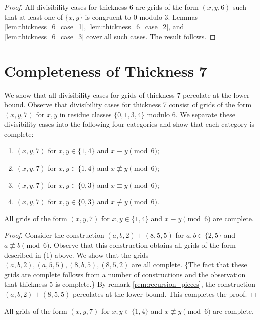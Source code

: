 \begin{proof}
All divisibility cases for thickness 6 are grids of the form $(x,y,6)$ such that at least one of $\{x,y\}$ is congruent to 0 modulo 3. Lemmas \ref{lem:thickness_6_case_1}, \ref{lem:thickness_6_case_2}, and \ref{lem:thickness_6_case_3} cover all such cases. The result follows.
\end{proof}

\section{Completeness of Thickness 7}

We show that all divisibility cases for grids of thickness 7 percolate at the lower bound. Observe that divisibility cases for thickness 7 consist of grids of the form $(x,y,7)$ for $x,y$ in residue classes $\{0,1,3,4\}$ modulo 6. We separate these divisibility cases into the following four categories and show that each category is complete:
\begin{enumerate}
\item $(x,y,7)$ for $x,y \in \{1,4\}$ and $x \equiv y \pmod 6$;
\item $(x,y,7)$ for $x,y \in \{1,4\}$ and $x \not\equiv y \pmod 6$;
\item $(x,y,7)$ for $x,y \in \{0,3\}$ and $x \equiv y \pmod 6$;
\item $(x,y,7)$ for $x,y \in \{0,3\}$ and $x \not\equiv y \pmod 6$.
\end{enumerate}

\begin{lem}
\label{lem:thickness_7_case_1}
All grids of the form $(x,y,7)$ for $x,y \in \{1,4\}$ and $x \equiv y \pmod 6$ are complete.
\end{lem}

\begin{proof}
Consider the construction $(a,b,2) + (8,5,5)$ for $a,b \in \{2,5\}$ and $a \not\equiv b \pmod 6$. Observe that this construction obtains all grids of the form described in (1) above. We show that the grids $(a,b,2), (a,5,5), (8,b,5), (8,5,2)$ are all complete. \{The fact that these grids are complete follows from a number of constructions and the observation that thickness 5 is complete.\} By remark \ref{rem:recursion_pieces}, the construction $(a,b,2) + (8,5,5)$ percolates at the lower bound. This completes the proof. 
\end{proof}

\begin{lem}
\label{lem:thickness_7_case_2}
All grids of the form $(x,y,7)$ for $x,y \in \{1,4\}$ and $x \not\equiv y \pmod 6$ are complete.
\end{lem}

